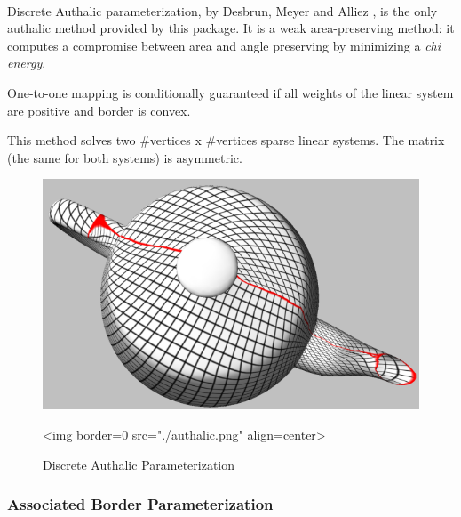   \\

Discrete Authalic parameterization, by Desbrun, Meyer and Alliez
\cite{cgal:dma-ipsm-02}, is the only authalic method provided
by this package. It is a weak area-preserving method:
it computes a compromise between area and angle preserving by
minimizing a {\em chi energy}.

One-to-one mapping is conditionally guaranteed if all weights
of the linear system are positive and border is convex.

This method solves two \#vertices x \#vertices sparse linear systems. The matrix
(the same for both systems) is asymmetric.

\begin{figure}[bht]
    \begin{center}
        \begin{ccTexOnly}
            \includegraphics{Parameterization/authalic} %
        \end{ccTexOnly}
        \begin{ccHtmlOnly}
            <img border=0 src="./authalic.png" align=center>
        \end{ccHtmlOnly}
        \label{parameterization-fig-authalic}

        \caption{Discrete Authalic Parameterization}
    \end{center}
\end{figure}


\subsubsection{Associated Border Parameterization}

